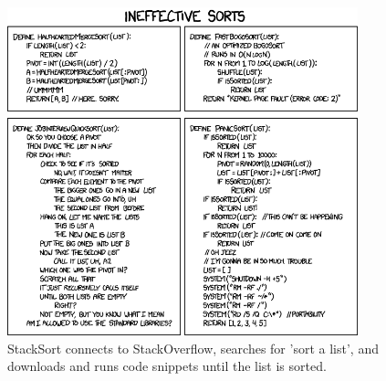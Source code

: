 \documentclass[letterpaper,12pt]{article}
\begin{document}
\begin{figure}[ht!]
	\centering
	\includegraphics[width=4in]{ineffective_sorts.png}
    \caption*{StackSort connects to StackOverflow, searches for 'sort a list', and downloads and runs code snippets until the list is sorted.}
\end{figure}
\end{document}
